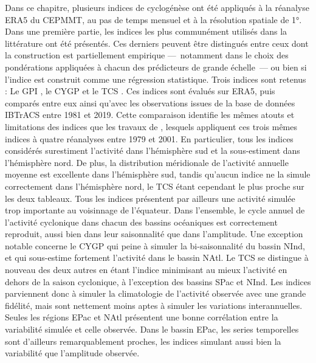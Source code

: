 \documentclass[../main.tex]{subfiles}
\begin{document}
Dans ce chapitre, plusieurs indices de cyclogénèse ont été appliqués à la réanalyse ERA5 du CEPMMT, au pas de temps mensuel et à la résolution spatiale de
\ang{1}. Dans une première partie, les indices les plus communément utilisés dans la littérature ont été présentés. Ces derniers peuvent être distingués entre
ceux dont la construction est partiellement empirique ---~notamment dans le choix des pondérations appliquées à chacun des prédicteurs de grande échelle~--- ou
bien si l'indice est construit comme une régression statistique. Trois indices sont retenus : Le GPI \parencite{emanuel_tropical_2004}, le CYGP
\parencite{royer_gcm_1998} et le TCS \parencite{tippett_poisson_2011}. Ces indices sont évalués sur ERA5, puis comparés entre eux ainsi qu'avec les observations
issues de la base de données IBTrACS entre \num{1981} et \num{2019}. Cette comparaison identifie les mêmes atouts et limitations des indices que les travaux de
\textcite{menkes_comparison_2012}, lesquels appliquent ces trois mêmes indices à quatre réanalyses entre \num{1979} et \num{2001}. En particulier, tous les
indices considérés surestiment l'activité dans l'hémisphère sud et la sous-estiment dans l'hémisphère nord. De plus, la distribution méridionale de l'activité
annuelle moyenne est excellente dans l'hémisphère sud, tandis qu'aucun indice ne la simule correctement dans l'hémisphère nord, le TCS étant cependant le plus
proche sur les deux tableaux. Tous les indices présentent par ailleurs une activité simulée trop importante au voisinnage de l'équateur. Dans l'ensemble, le
cycle annuel de l'activité cyclonique dans chacun des bassins océaniques est correctement reproduit, aussi bien dans leur saisonnalité que dans l'amplitude. Une
exception notable concerne le CYGP qui peine à simuler la bi-saisonnalité du bassin NInd, et qui sous-estime fortement l'activité dans le bassin NAtl. Le TCS se
distingue à nouveau des deux autres en étant l'indice minimisant au mieux l'activité en dehors de la saison cyclonique, à l'exception des bassins SPac et NInd.
Les indices parviennent donc à simuler la climatologie de l'activité observée avec une grande fidélité, mais sont nettement moins aptes à simuler les variations
interannuelles. Seules les régions EPac et NAtl présentent une bonne corrélation entre la variabilité simulée et celle observée. Dans le bassin EPac, les series
temporelles sont d'ailleurs remarquablement proches, les indices simulant aussi bien la variabilité que l'amplitude observée.
\end{document}

